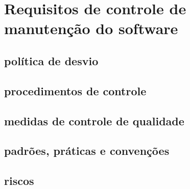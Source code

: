 \chapter{Requisitos de controle de manutenção do software}

\section{política de desvio}

\section{procedimentos de controle}

\section{medidas de controle de qualidade}

\section{padrões, práticas e convenções}

\section{riscos}